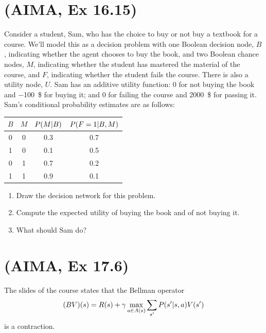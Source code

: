 \documentclass[11pt, a4paper]{article}
\begin{document}
\newpage

\section{(AIMA, Ex 16.15)}

Consider a student, Sam, who has the choice to buy or not buy a textbook for a course. We'll model this as a decision problem with one Boolean decision node, $B$, indicating whether the agent chooses to buy the book, and two Boolean chance nodes,
$M$, indicating whether the student has mastered the material of the course, and $F$, indicating whether the student fails the course. There is also a utility node, $U$. Sam has an additive utility function: 0 for not buying the book and \qty{-100}{\$} for buying it; and 0 for failing the course and \qty{2000}{\$} for passing it. Sam's conditional probability estimates are as follows:

\begin{table}[h]
    \centering
    \begin{tabular}{cc|cc}
        \toprule
        $B$ & $M$ & $P(M \vert B)$ & $P(F = 1 \vert B, M)$ \\
        \midrule
        0 & 0 & 0.3 & 0.7 \\
        1 & 0 & 0.1 & 0.5 \\
        0 & 1 & 0.7 & 0.2 \\
        1 & 1 & 0.9 & 0.1 \\
        \bottomrule
    \end{tabular}
\end{table}

\begin{enumerate}
    \item Draw the decision network for this problem.

    \item Compute the expected utility of buying the book and of not buying it.

    \item What should Sam do?
\end{enumerate}

\newpage

\section{(AIMA, Ex 17.6)}

The slides of the course states that the Bellman operator
\begin{equation*}
    (B V)(s) = R(s) + \gamma \max_{a \in A(s)} \sum_{s'} P(s' \vert s, a) V(s')
\end{equation*}
is a contraction.
\end{document}
